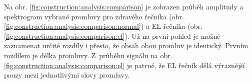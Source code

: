 Na obr. \ref{fig:construction:analysis:comparison} je zobrazen průběh amplitudy a spektrogram vybrané promluvy pro zdravého řečníka (obr. \ref{fig:construction:analysis:comparison:normal}) a EL řečníka (obr. \ref{fig:construction:analysis:comparison:el}).
Už na první pohled je možné zaznamenat určité rozdíly i přesto, že obsah obou promluv je identický.
Prvním rozdílem je délka promluvy.
Z~průběhu signálu na obr. \ref{fig:construction:analysis:comparison:el} je patrné, že EL řečník dělá výraznější pauzy mezi jednotlivými slovy promluvy.


